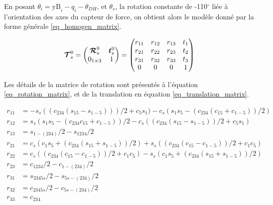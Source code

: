 \begin{appendices}
	En posant $ \theta_i = \text{yB}_i - q_i - \theta_{DH} $, et $ \theta_s $, la rotation constante de -110$^{\circ}$ liée à l'orientation des axes du capteur de force,  on obtient alors le modèle donné par la forme générale \cref{eq_homogen_matrix}. 
	
	\begin{equation} \label{eq_homogen_matrix}
	\matrCal{T}_s^0 =
		\begin{pmatrix}
			\matrCal{R}^0_s & \vect{t}^0_s \\ 0_{1\times 3} & 1 \\
		\end{pmatrix} = 
		\begin{pmatrix}
			r_{11} & r_{12} & r_{13} & t_{1} \\
			r_{21} & r_{22} & r_{23} & t_{2} \\
			r_{31} & r_{32} & r_{33} & t_{3} \\
			0 & 0 & 0 & 1 \\
		\end{pmatrix}
	\end{equation}
	
	Les détails de la matrice de rotation sont présentés à l'équation \cref{eq_rotation_matrix}, et de la translation en équation \cref{eq_translation_matrix}.
	
	\begin{equation} \label{eq_rotation_matrix}
		\begin{split}
			r_{11} &= -s_{s}((c_{234}(s_{15} - s_{1-5})))/2 + c_{5}s_{1}) - c_{s}(s_{1}s_{5} - (c_{234}(c_{15} + c_{1-5}))/2) \\
			r_{12} &= s_{s}(s_{1} s_5 - (c_{234} c_{15} + c_{1-5}))/2 - c_s ((c_{234} (s_{15} - s_{1-5}))/2 + c_5 s_1) \\	
			r_{13} &= s_{1-(234)}/2 - s_{1234}/2 \\
			r_{21} &= c_s (c_1 s_5 + (c_{234} (s_{15} + s_{1-5}))/2) + s_s ((c_{234} (c_{15} - c_{1-5}))/2 + c_{1} c_{5}) \\ 
			r_{22} &= c_s ((c_{234} (c_{15} - c_{1-5}))/2 + c_1 c_5) - s_s (c_1 s_5 + (c_{234} (s_{15} + s_{1-5}))/2) \\
			r_{23} &= c_{1234}/2 - c_{1-(234)}/2 \\
			r_{31} &= s_{2345s}/2 - s_{5s-(234)}/2 \\
			r_{32} &= c_{2345s}/2 - c_{5s-(234)}/2 \\
			r_{33} &= c_{234}\\
		\end{split}
	\end{equation}
	

\end{appendices}
